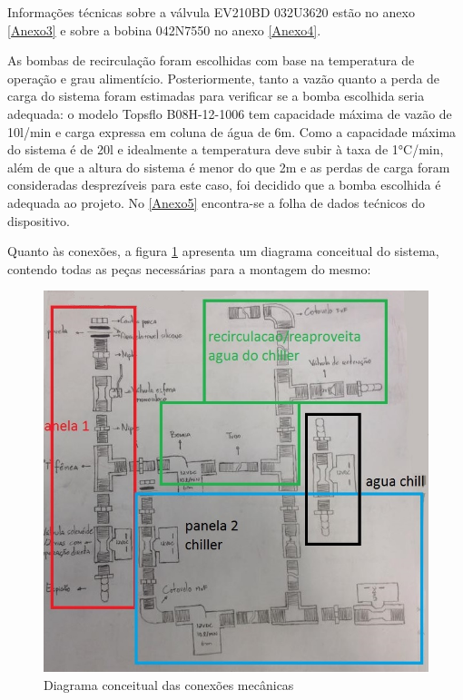 Informações técnicas sobre a válvula EV210BD 032U3620 estão no anexo \ref{Anexo3} e sobre a bobina 042N7550 no anexo \ref{Anexo4}.

As bombas de recirculação foram escolhidas com base na temperatura de operação e grau alimentício. Posteriormente, tanto a vazão quanto a perda de carga do sistema foram estimadas para verificar se a bomba escolhida seria adequada: o modelo Topsflo B08H-12-1006 tem capacidade máxima de vazão de 10l/min e carga expressa em coluna de água de 6m. Como a capacidade máxima do sistema é de 20l e idealmente a temperatura deve subir à taxa de 1\si{\degree}C/min, além de que a altura do sistema é menor do que 2m e as perdas de carga foram consideradas desprezíveis para este caso, foi decidido que a bomba escolhida é adequada ao projeto. No \ref{Anexo5} encontra-se a folha de dados tećnicos do dispositivo.

Quanto às conexões, a figura \ref{conexoes_rascunho} apresenta um diagrama conceitual do sistema, contendo todas as peças necessárias para a montagem do mesmo:

\begin{figure}[H]
	\centering
	\includegraphics[scale=0.55]{./Resources/conexoes.jpg}
	\captionsetup{justification=centering}
	\caption[Diagrama conceitual das conexões mecânicas]{Diagrama conceitual das conexões mecânicas}
	\label{conexoes_rascunho}
\end{figure}

